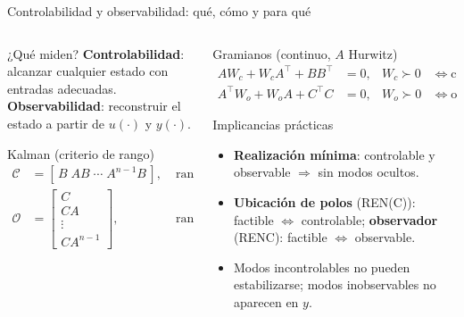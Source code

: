 \documentclass[
    10pt,
    aspectratio=169,
    xcolor={dvipsnames},
    spanish,
    ]{beamer}
\begin{document}
\begin{frame}{Controlabilidad y observabilidad: qué, cómo y para qué}
\footnotesize
\begin{columns}[T]
  \begin{column}{0.52\textwidth}
    \begin{block}{¿Qué miden?}
  	\textbf{Controlabilidad}: alcanzar cualquier estado con entradas adecuadas.\\
  	\textbf{Observabilidad}: reconstruir el estado a partir de $u(\cdot)$ y $y(\cdot)$.
    \end{block}
    \begin{block}{Kalman (criterio de rango)}
      \begin{align}
        \mathcal C &= [\,B\;AB\;\cdots\;A^{n-1}B\,], & \operatorname{rank}(\mathcal C){=}n &\iff \text{controlable},\\
        \mathcal O &= \begin{bmatrix} C\\ CA\\ \vdots\\ CA^{n-1}\end{bmatrix}, & \operatorname{rank}(\mathcal O){=}n &\iff \text{observable}.
      \end{align}
    \end{block}
  \end{column}
  \begin{column}{0.47\textwidth}
    \begin{block}{Gramianos (continuo, $A$ Hurwitz)}
      \begin{align}
        A W_c + W_c A^\top + B B^\top &= 0, & W_c\succ 0 &\iff \text{controlable},\\
        A^\top W_o + W_o A + C^\top C &= 0, & W_o\succ 0 &\iff \text{observable}.
      \end{align}
    \end{block}
    \begin{block}{Implicancias prácticas}
      \begin{itemize}\itemsep2pt
        \item \textbf{Realización mínima}: controlable y observable $\Rightarrow$ sin modos ocultos.
        \item \textbf{Ubicación de polos} (REN(C)): factible $\iff$ controlable; \textbf{observador} (RENC): factible $\iff$ observable.
        \item Modos incontrolables no pueden estabilizarse; modos inobservables no aparecen en $y$.
      \end{itemize}
    \end{block}
  \end{column}
\end{columns}
\end{frame}
\end{document}
